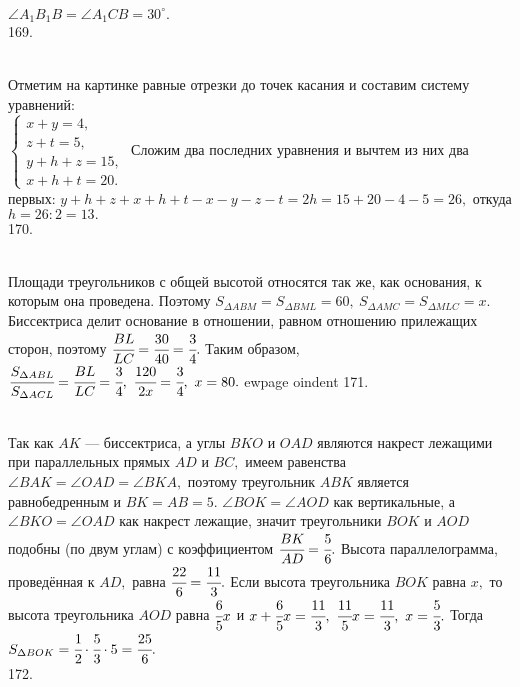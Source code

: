 $\angle A_1B_1B=\angle A_1CB=30^\circ.$\\
169. \begin{figure}[ht!]
\end{figure}\\
Отметим на картинке равные отрезки до точек касания и составим систему уравнений:\\ $\begin{cases}x+y=4,\\ z+t=5,\\ y+h+z=15,\\ x+h+t=20.\end{cases}$ Сложим два последних уравнения и вычтем из них два первых: $y+h+z+x+h+t-x-y-z-t=2h=15+20-4-5=26,$ откуда $h=26:2=13.$\\
170. \begin{figure}[ht!]
\end{figure}\\
Площади треугольников с общей высотой относятся так же, как основания, к которым она проведена. Поэтому $S_{\Delta ABM}=S_{\Delta BML}=60,\ S_{\Delta AMC}=S_{\Delta MLC}=x.$ Биссектриса делит основание в отношении, равном отношению прилежащих сторон, поэтому $\cfrac{BL}{LC}=\cfrac{30}{40}=\cfrac{3}{4}.$ Таким образом,
$\cfrac{S_{\Delta ABL}}{S_{\Delta ACL}}=\cfrac{BL}{LC}=\cfrac{3}{4},\ \cfrac{120}{2x}=\cfrac{3}{4},\ x=80.$
ewpage
oindent
171. \begin{figure}[ht!]
\end{figure}\\
Так как $AK$ --- биссектриса, а углы $BKO$ и $OAD$ являются накрест лежащими при параллельных прямых $AD$ и $BC,$ имеем равенства $\angle BAK=\angle OAD=\angle BKA,$ поэтому треугольник $ABK$ является равнобедренным и $BK=AB=5.$ $\angle BOK=\angle AOD$ как вертикальные, а $\angle BKO=\angle OAD$ как накрест лежащие, значит треугольники $BOK$ и $AOD$ подобны (по двум углам) с коэффициентом $\cfrac{BK}{AD}=\cfrac{5}{6}.$ Высота параллелограмма, проведённая к $AD,$ равна $\cfrac{22}{6}=\cfrac{11}{3}.$ Если высота треугольника $BOK$ равна $x,$ то высота треугольника $AOD$ равна $\cfrac{6}{5}x$ и $x+\cfrac{6}{5}x=\cfrac{11}{3},\ \cfrac{11}{5} x=\cfrac{11}{3},\ x=\cfrac{5}{3}.$ Тогда $S_{\Delta BOK}=\cfrac{1}{2}\cdot\cfrac{5}{3}\cdot5=\cfrac{25}{6}.$\\
172. \begin{figure}[ht!]
\end{figure}\\
